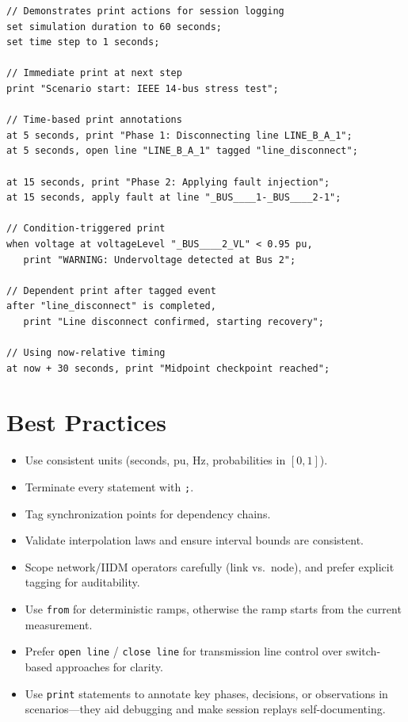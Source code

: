 \documentclass[12pt]{article}
\begin{document}
\begin{lstlisting}
// Demonstrates print actions for session logging
set simulation duration to 60 seconds;
set time step to 1 seconds;

// Immediate print at next step
print "Scenario start: IEEE 14-bus stress test";

// Time-based print annotations
at 5 seconds, print "Phase 1: Disconnecting line LINE_B_A_1";
at 5 seconds, open line "LINE_B_A_1" tagged "line_disconnect";

at 15 seconds, print "Phase 2: Applying fault injection";
at 15 seconds, apply fault at line "_BUS____1-_BUS____2-1";

// Condition-triggered print
when voltage at voltageLevel "_BUS____2_VL" < 0.95 pu,
   print "WARNING: Undervoltage detected at Bus 2";

// Dependent print after tagged event
after "line_disconnect" is completed,
   print "Line disconnect confirmed, starting recovery";

// Using now-relative timing
at now + 30 seconds, print "Midpoint checkpoint reached";
\end{lstlisting}

\section{Best Practices}

\begin{itemize}
  \item Use consistent units (seconds, pu, Hz, probabilities in $[0,1]$).
  \item Terminate every statement with \texttt{;}.
  \item Tag synchronization points for dependency chains.
  \item Validate interpolation laws and ensure interval bounds are consistent.
  \item Scope network/IIDM operators carefully (link vs.\ node), and prefer explicit tagging for auditability.
  \item Use \texttt{from} for deterministic ramps, otherwise the ramp starts from the current measurement.
  \item Prefer \texttt{open line} / \texttt{close line} for transmission line control over switch-based
        approaches for clarity.
  \item Use \texttt{print} statements to annotate key phases, decisions, or observations in scenarios---they aid
        debugging and make session replays self-documenting.
\end{itemize}
\end{document}
